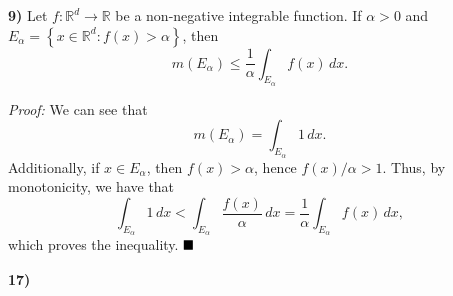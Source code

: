 \documentclass[12pt]{article}
\newcommand{\R}{\ensuremath{\mathbb{R}}}
\newcommand{\braceb}[1]{\left\{#1\right\}}
\newcommand{\proof}{\textit{Proof: }}
\newcommand{\done}{\ensuremath{\strut\hfill\blacksquare}}
\begin{document}
\pagestyle{fancy}

\setlength{\parindent}{0in}
\setlength{\parskip}{0.1in}

\textbf{9)}
Let \( f : \R^d \to \R \) be a non-negative integrable function.
If \( \alpha > 0 \) and \break
\( E_\alpha = \braceb{x \in \R^d : f(x) > \alpha } \),
then
\[
	m(E_\alpha)
	\leq \frac{1}{\alpha} \int_{E_\alpha} f(x) \, dx.
\]

\proof
We can see that
\[
	m(E_\alpha)
	= \int_{E_\alpha} 1 \, dx.
\]
Additionally, if \( x \in E_\alpha \), then \( f(x) > \alpha \), hence
\( f(x) / \alpha > 1 \).
Thus, by monotonicity, we have that
\[
	\int_{E_\alpha} 1 \, dx
	< \int_{E_\alpha} \frac{f(x)}{\alpha} \, dx
	= \frac{1}{\alpha} \int_{E_\alpha} f(x) \, dx,
\]
which proves the inequality.
\done

\textbf{17)}

{}
\end{document}

